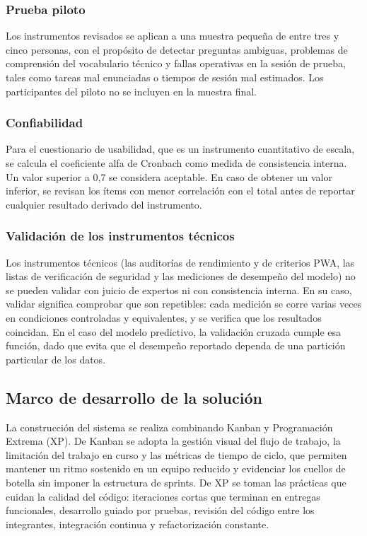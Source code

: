 \documentclass[conference]{IEEEtran}
\begin{document}
\subsubsection{Prueba piloto}
Los instrumentos revisados se aplican a una muestra pequeña de entre tres y cinco personas, con el propósito de detectar preguntas ambiguas, problemas de comprensión del vocabulario técnico y fallas operativas en la sesión de prueba, tales como tareas mal enunciadas o tiempos de sesión mal estimados. Los participantes del piloto no se incluyen en la muestra final.

\subsubsection{Confiabilidad}
Para el cuestionario de usabilidad, que es un instrumento cuantitativo de escala, se calcula el coeficiente alfa de Cronbach como medida de consistencia interna. Un valor superior a 0{,}7 se considera aceptable. En caso de obtener un valor inferior, se revisan los ítems con menor correlación con el total antes de reportar cualquier resultado derivado del instrumento.

\subsubsection{Validación de los instrumentos técnicos}
Los instrumentos técnicos (las auditorías de rendimiento y de criterios PWA, las listas de verificación de seguridad y las mediciones de desempeño del modelo) no se pueden validar con juicio de expertos ni con consistencia interna. En su caso, validar significa comprobar que son repetibles: cada medición se corre varias veces en condiciones controladas y equivalentes, y se verifica que los resultados coincidan. En el caso del modelo predictivo, la validación cruzada cumple esa función, dado que evita que el desempeño reportado dependa de una partición particular de los datos.

\subsection{Marco de desarrollo de la solución}
La construcción del sistema se realiza combinando Kanban y Programación Extrema (XP). De Kanban se adopta la gestión visual del flujo de trabajo, la limitación del trabajo en curso y las métricas de tiempo de ciclo, que permiten mantener un ritmo sostenido en un equipo reducido y evidenciar los cuellos de botella sin imponer la estructura de sprints. De XP se toman las prácticas que cuidan la calidad del código: iteraciones cortas que terminan en entregas funcionales, desarrollo guiado por pruebas, revisión del código entre los integrantes, integración continua y refactorización constante.
\end{document}
